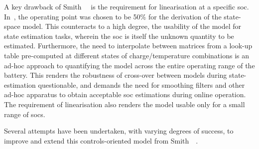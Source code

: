A key drawback of Smith~\etal{}~\cite{Smith2007} is the requirement for linearisation at a specific
\gls{soc}. In~\cite{Smith2007}, the operating point was chosen to be 50\% for the derivation of the
state-space model. This counteracts to a high degree, the usability of the model for state
estimation tasks, wherein the \gls{soc} is itself the unknown quantity to be estimated. Furthermore,
the need to interpolate between matrices from a look-up table pre-computed at different states of
charge/temperature combinations is an ad-hoc approach to quantifying the model across the entire
operating range of the battery. This renders the robustness of cross-over between models during
state-estimation questionable, and demands the need for smoothing filters and other ad-hoc apparatus
to obtain acceptable \gls{soc} estimations during online operation. The requirement of linearisation
also renders the model usable only for a small range of \gls{soc}s.

Several attempts have been undertaken, with varying degrees of success, to improve and extend this
controls-oriented model from Smith~\etal{}~\cite{Smith2007}.









